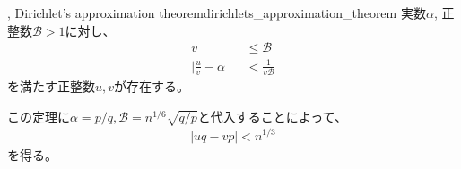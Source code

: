 \begin{Theo}{, Dirichlet's approximation theorem}{dirichlets_approximation_theorem}
実数$\alpha$, 正整数$\mathcal{B}>1$に対し、
\begin{align*}
v &\le \mathcal{B}\\
\mid \frac{u}{v} - \alpha \mid &< \frac{1}{v\mathcal{B}}
\end{align*}
を満たす正整数$u,v$が存在する。
\end{Theo}

この定理に$\alpha=p/q,\mathcal{B}=n^{1/6}\sqrt{q/p}$と代入することによって、
\begin{align*}
\mid uq - vp \mid < n^{1/3}
\end{align*}
を得る。
